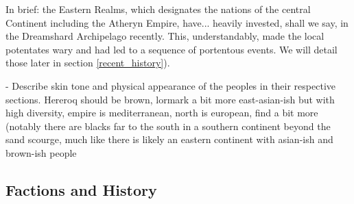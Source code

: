 In brief: the Eastern Realms, which designates the nations of the central Continent including the Atheryn Empire, have... heavily invested, shall we say, in the Dreamshard Archipelago recently. This, understandably, made the local potentates wary and had led to a sequence of portentous events. We will detail those later in section \ref{recent_history}).






- Describe skin tone and physical appearance of the peoples in their respective sections. Hereroq should be brown, lormark a bit more east-asian-ish but with high diversity, empire is mediterranean, north is european, find a bit more (notably there are blacks far to the south in a southern continent beyond the sand scourge, much like there is likely an eastern continent with asian-ish and brown-ish people







\subsection{Factions and History}


